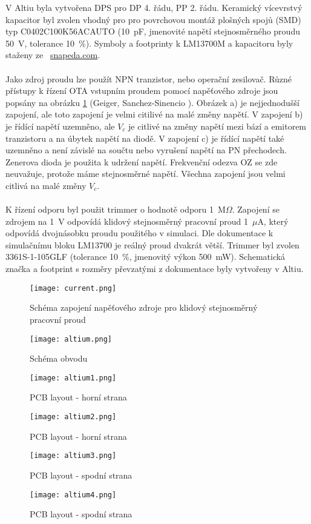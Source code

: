 \noindent V Altiu byla vytvořena DPS pro DP 4. řádu, PP 2. řádu. Keramický vícevrstvý kapacitor byl zvolen vhodný pro pro povrchovou montáž plošných spojů (SMD) typ C0402C100K56ACAUTO (10~pF, jmenovité napětí stejnosměrného proudu 50~V, tolerance 10~\%). Symboly a footprinty k LM13700M a kapacitoru byly staženy ze~ \url{snapeda.com}. \\
\\
Jako zdroj proudu lze použít NPN tranzistor, nebo operační zesilovač. Různé přístupy k řízení OTA vstupním proudem pomocí napěťového zdroje jsou popsány na obrázku \ref{s:DC} (Geiger, Sanchez-Sinencio \cite{25}). Obrázek a) je nejjednodušší zapojení, ale toto zapojení je velmi citilivé na malé změny napětí. V zapojení b) je řídící napětí uzemněno, ale $V_c$ je citlivé na změny napětí mezi bází a emitorem tranzistoru a na úbytek napětí na diodě. V zapojení c) je řídící napětí také uzemněno a není závislé na součtu nebo vyrušení napětí na PN přechodech. Zenerova dioda je použita k udržení napětí. Frekvenční odezva OZ se zde neuvažuje, protože máme stejnosměrné napětí. Všechna zapojení jsou velmi citlivá na malé změny $V_c$. \\
\\
K řízení odporu byl použit trimmer o hodnotě odporu 1~M$\Omega$. Zapojení se zdrojem na 1~V odpovídá klidový stejnosměrný pracovní proud 1~$\mu$A, který odpovídá dvojnásobku proudu použitého v simulaci. Dle dokumentace k simulačnímu bloku LM13700 je reálný proud dvakrát větší. Trimmer byl zvolen 3361S-1-105GLF (tolerance 10~\%, jmenovitý výkon 500~mW). Schematická značka a footprint s rozměry převzatými z dokumentace byly vytvořeny v Altiu.
\begin{figure}[h]
\centering
\texttt{[image: current.png]}
\caption{Schéma zapojení napěťového zdroje pro klidový stejnosměrný pracovní proud \label{s:DC}}
\end{figure}
\begin{figure}[h]
\centering
\texttt{[image: altium.png]}
\caption{Schéma obvodu}
\end{figure}
\begin{figure}[h]
\centering
\texttt{[image: altium1.png]}
\caption{PCB layout - horní strana}
\end{figure}
\begin{figure}[h]
\centering
\texttt{[image: altium2.png]}
\caption{PCB layout - horní strana}
\end{figure}
\begin{figure}[h]
\centering
\texttt{[image: altium3.png]}
\caption{PCB layout - spodní strana}
\end{figure}
\begin{figure}[h]
\centering
\texttt{[image: altium4.png]}
\caption{PCB layout - spodní strana}
\end{figure}